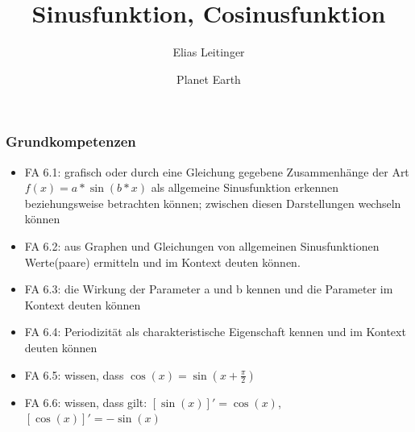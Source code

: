 \documentclass[12pt]{beamer}
\title{Sinusfunktion, Cosinusfunktion}
\author{Elias Leitinger}
\date{\small Planet Earth}
\begin{document}
\begin{frame}
  \titlepage

\end{frame}

\begin{frame}
  \frametitle{Grundkompetenzen}
  \begin{itemize}
  \item FA 6.1: grafisch oder durch eine Gleichung gegebene Zusammenhänge der Art $f(x)= a*\sin(b*x)$
als allgemeine Sinusfunktion erkennen beziehungsweise betrachten können; zwischen diesen Darstellungen
wechseln können
  \item FA 6.2: aus Graphen und Gleichungen von allgemeinen Sinusfunktionen Werte(paare) ermitteln
und im Kontext deuten können.
  \item FA 6.3: die Wirkung der Parameter a und b kennen und die Parameter im Kontext deuten können
  \item FA 6.4: Periodizität als charakteristische Eigenschaft kennen und im Kontext deuten können
  \item FA 6.5: wissen, dass $\cos(x) = \sin(x+\frac{\pi}{2})$
  \item FA 6.6: wissen, dass gilt: $[\sin(x)]' = \cos(x)$, $[\cos(x)]' = -\sin(x)$
  \end{itemize}
  

\end{frame}
\end{document}
